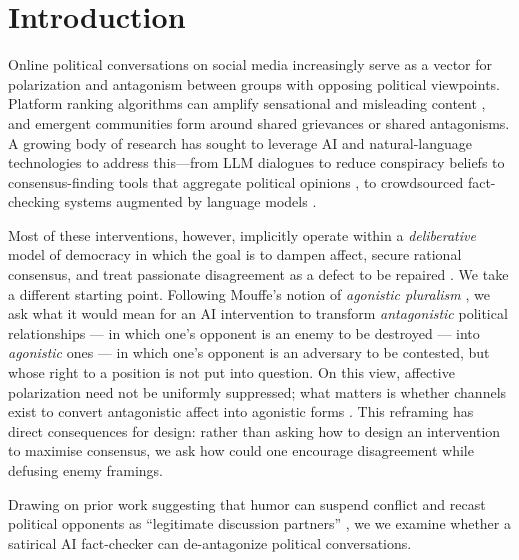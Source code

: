 \section{Introduction}\label{sec:intro}

Online political conversations on social media increasingly serve as a vector for polarization and antagonism between groups with opposing political viewpoints. Platform ranking algorithms can amplify sensational and misleading content \cite{Strayetal2023AlgorithmicManagement}, and emergent communities form around shared grievances or shared antagonisms. A growing body of research has sought to leverage AI and natural-language technologies to address this---from LLM dialogues to reduce conspiracy beliefs \cite{Costelloetal2024ReducingConspiracyBeliefs} to consensus-finding tools that aggregate political opinions \cite{Tessleretal2024HabermasMachine, Argyleetal2023LeveragingAI}, to crowdsourced fact-checking systems augmented by language models \cite{Deetal2024Supernotes, LiAndBakker2026AIFactChecking}.

Most of these interventions, however, implicitly operate within a \textit{deliberative} model of democracy in which the goal is to dampen affect, secure rational consensus, and treat passionate disagreement as a defect to be repaired \cite{LazarAndManuali2026LLMsDemocracy}. We take a different starting point. Following Mouffe's notion of \textit{agonistic pluralism} \cite{Mouffe2000DemocraticParadox}, we ask what it would mean for an AI intervention to transform \textit{antagonistic} political relationships — in which one's opponent is an enemy to be destroyed — into \textit{agonistic} ones — in which one's opponent is an adversary to be contested, but whose right to a position is not put into question. On this view, affective polarization need not be uniformly suppressed; what matters is whether channels exist to convert antagonistic affect into agonistic forms \cite{Westphal2024AffectivePolarization}. This reframing has direct consequences for design: rather than asking how to design an intervention to maximise consensus, we ask how could one encourage disagreement while defusing enemy framings.

Drawing on prior work suggesting that humor can suspend conflict and recast political opponents as ``legitimate discussion partners'' \cite{BoukesAndHameleers2023FactsOrHumor, NorrickAndSpitz2008HumorAsAResource}, we we examine whether a satirical AI fact-checker can de-antagonize political conversations.

